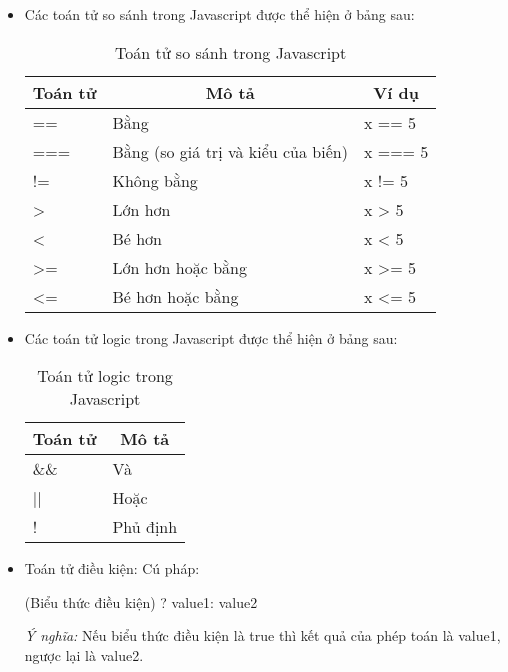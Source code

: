 \begin{itemize}
\begin{center}
\begin{longtable}{|m{2cm}|m{3cm}| m{3cm}|}
\end{longtable}
\end{center}
\vspace{-1cm}
\item	Các toán tử so sánh trong Javascript được thể hiện ở bảng sau:



\begin{center}
 \begin{longtable}{|m{3cm}|m{4cm}| m{3cm}|}
 \caption[Toán tử so sánh trong Javascript]{Toán tử so sánh trong Javascript}
   \endfirsthead
   \endhead
\hline
\multicolumn{1}{|c|}{\textbf{Toán tử}} & \multicolumn{1}{c|}{\textbf{	Mô tả}} & \multicolumn{1}{c|}{\textbf{Ví dụ}}\\ \hline
== &	Bằng &	x == 5\\ \hline
=== &	Bằng (so giá trị và kiểu của biến) &	x === 5\\ \hline
!= &	Không bằng &	x != 5\\ \hline
> &	Lớn hơn &	x > 5\\ \hline
< &	Bé hơn &	x < 5\\ \hline
>= &	Lớn hơn hoặc bằng &	x >= 5\\ \hline
<= &	Bé hơn hoặc bằng &	x <= 5\\ \hline

\end{longtable}
\end{center}
\vspace{-1cm}
\item	Các toán tử logic trong Javascript được thể hiện ở bảng sau:

\begin{center}
 \begin{longtable}{|m{3cm}|m{4cm}|}
 \caption[Toán tử logic trong Javascript]{Toán tử logic trong Javascript}
    \endfirsthead
    \endhead
\hline
\multicolumn{1}{|c|}{\textbf{Toán tử}} &\multicolumn{1}{c|}{	\textbf{Mô tả}}\\ \hline
\&\& &	Và\\ \hline
|| &	Hoặc\\ \hline
! &	Phủ định\\ \hline 

\end{longtable}
\end{center}
\vspace{-1cm}
\item	Toán tử điều kiện:
Cú pháp:

{\ttfamily
 (Biểu thức điều kiện) ? value1: value2} 

\textit{Ý nghĩa:} Nếu biểu thức điều kiện là true thì kết quả của phép toán là value1, ngược lại là value2.
\end{itemize}

